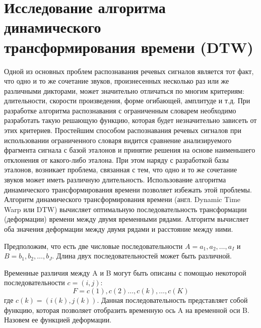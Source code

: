 \documentclass[a4paper,14pt,russian,utf8,nocolumnsxix,nocolumnxxxi,nocolumnxxxii]{eskdtext}
\begin{document}
\section[Исследование алгоритма динамического трансформирования \\ времени (DTW)]{Исследование алгоритма \\динамического \\трансформирования времени (DTW)}
Одной из основных проблем распознавания речевых сигналов является тот факт, что одно и то же сочетание звуков, произнесенных несколько раз или же различными дикторами, может значительно отличаться по многим критериям: длительности, скорости произведения, форме огибающей, амплитуде и т.д. При разработке алгоритма распознавания с ограниченным словарем необходимо разработать такую решающую функцию, которая будет незначительно зависеть от этих критериев.
Простейшим способом распознавания речевых сигналов при использовании ограниченного словаря видится сравнение анализируемого фрагмента сигнала с базой эталонов и принятие решения на основе наименьшего отклонения от какого-либо эталона. При этом наряду с разработкой базы эталонов, возникает проблема, связанная с тем, что одно и то же сочетание звуков может иметь различную длительность. Использование алгоритма динамического трансформирования времени позволяет избежать этой проблемы.
Алгоритм динамического трансформирования времени (англ. Dynamic Time Warp или DTW) вычисляет оптимальную последовательность трансформации (деформации) времени между двумя временными рядами. Алгоритм вычисляет оба значения деформации между двумя рядами и расстояние между ними.\cite{sakoe}

Предположим, что есть две числовые последовательности $A= a_{1}, a_{2}, \dots, a_{I}$ и $B=b_{1}, b_{2}, \dots, b_{J}$. Длина двух последовательностей может быть различной.

Временные различия между A и B могут быть описаны с помощью некоторой последовательности $c=(i,j)$:
\begin{equation}
	F=c(1),c(2)\dots,c(k),\dots,c(K)
	\label{eq:F}
\end{equation}
где $c(k)=(i(k),j(k))$.
Данная последовательность представляет собой функцию, которая позволяет отобразить временную ось A на временной оси B. Назовем ее функцией деформации. \cite{sakoe}
\end{document}
